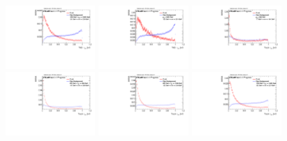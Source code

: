 \begin{figure}
\includegraphics[width=0.3\textwidth]{sascha_input/Appendix/Distributions/top/distributions/beta3/h_assisted_tj_nSub32_3_bin5.pdf} \hspace{1mm}
\includegraphics[width=0.3\textwidth]{sascha_input/Appendix/Distributions/top/distributions/beta3/h_assisted_tj_nSub32_3_bin6.pdf} 
\bigskip
\includegraphics[width=0.3\textwidth]{sascha_input/Appendix/Distributions/top/distributions/beta3/h_normal_tj_nSub32_3_bin1.pdf} \hspace{1mm}
\includegraphics[width=0.3\textwidth]{sascha_input/Appendix/Distributions/top/distributions/beta3/h_normal_tj_nSub32_3_bin2.pdf} \hspace{1mm}
\includegraphics[width=0.3\textwidth]{sascha_input/Appendix/Distributions/top/distributions/beta3/h_normal_tj_nSub32_3_bin3.pdf} 
\bigskip
\includegraphics[width=0.3\textwidth]{sascha_input/Appendix/Distributions/top/distributions/beta3/h_normal_tj_nSub32_3_bin4.pdf} \hspace{1mm}

\end{figure}
